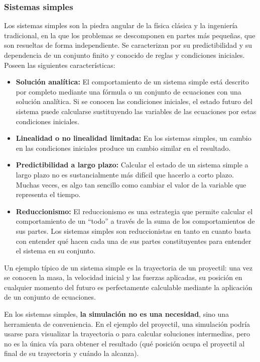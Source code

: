 \documentclass[10pt,a4paper,spanish]{article}
\begin{document}
\subsubsection{Sistemas simples}

Los sistemas simples son la piedra angular de la física clásica y la ingeniería tradicional, en la que los problemas se descomponen en partes más pequeñas, que son resueltas de forma independiente. Se caracterizan por su predictibilidad y su dependencia de un conjunto finito y conocido de reglas y condiciones iniciales. Poseen las siguientes características:

\begin{itemize}
    \item \textbf{Solución analítica:} El comportamiento de un sistema simple está descrito por completo mediante una fórmula o un conjunto de ecuaciones con una solución analítica. Si se conocen las condiciones iniciales, el estado futuro del sistema puede calcularse sustituyendo las variables de las ecuaciones por estas condiciones iniciales.
    \item \textbf{Linealidad o no linealidad limitada:} En los sistemas simples, un cambio en las condiciones iniciales produce un cambio similar en el resultado.
    \item \textbf{Predictibilidad a largo plazo:} Calcular el estado de un sistema simple a largo plazo no es sustancialmente más difícil que hacerlo a corto plazo. Muchas veces, es algo tan sencillo como cambiar el valor de la variable que representa el tiempo.
    \item \textbf{Reduccionismo:} El reduccionismo es una estrategia que permite calcular el comportamiento de un ``todo'' a través de la suma de los comportamientos de sus partes. Los sistemas simples son reduccionistas en tanto en cuanto basta con entender qué hacen cada una de sus partes constituyentes para entender el sistema en su conjunto.
\end{itemize}

Un ejemplo típico de un sistema simple es la trayectoria de un proyectil: una vez se conocen la masa, la velocidad inicial y las fuerzas aplicadas, su posición en cualquier momento del futuro es perfectamente calculable mediante la aplicación de un conjunto de ecuaciones.

En los sistemas simples, \textbf{la simulación no es una necesidad}, sino una herramienta de conveniencia. En el ejemplo del proyectil, una simulación podría usarse para visualizar la trayectoria o para calcular soluciones intermedias, pero no es la única vía para obtener el resultado (qué posición ocupa el proyectil al final de su trayectoria y cuándo la alcanza).
\end{document}
